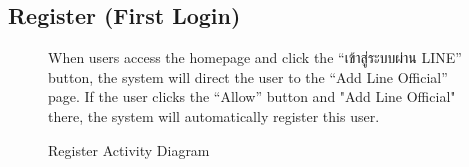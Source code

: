\documentclass[12pt,oneside,openright,a4paper]{cpe-english-project}
\begin{document}
      \subsection{Register (First Login)}
      \begin{figure}[H]
        \centering
        \caption{Register Activity Diagram}\label{fig:AD_Register}
        \begin{justify}
          \qquad When users access the homepage and click the “\textthai{เข้าสู่ระบบผ่าน} LINE” button, the system will direct the user to the “Add Line Official” page. If the user clicks the “Allow” button and "Add Line Official" there, the system will automatically register this user.  \par
        \end{justify}
      \end{figure}
\end{document}

